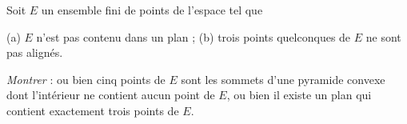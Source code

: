 Soit $E$ un ensemble fini de points de l'espace tel que

(a) $E$ n'est pas contenu dans un plan ; (b) trois points quelconques de $E$ ne sont pas alignés.

\emph{Montrer} : ou bien cinq points de $E$ sont les sommets d'une pyramide convexe dont l'intérieur ne contient aucun point de $E$, ou bien il existe un plan qui contient exactement trois points de $E$.
